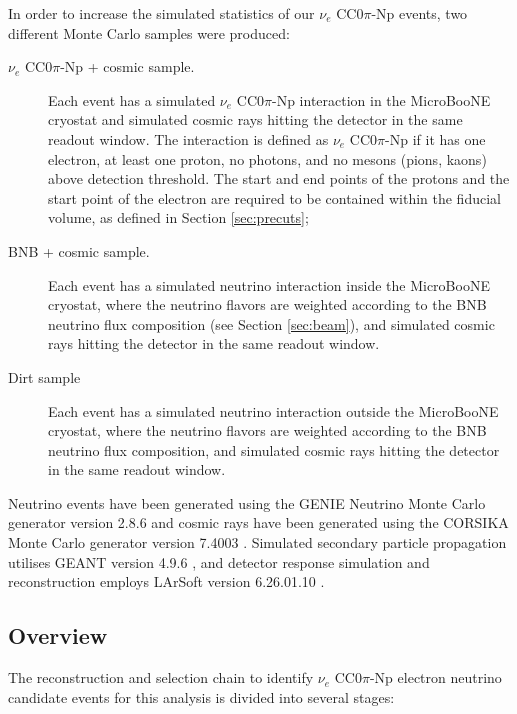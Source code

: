 In order to increase the simulated statistics of our $\nu_e$ CC0$\pi$-Np events, two different Monte Carlo samples were produced:
\begin{description}
\item[$\nu_{e}$ CC0$\pi$-Np + cosmic sample.] Each event has a simulated $\nu_{e}$ CC0$\pi$-Np interaction in the MicroBooNE cryostat and simulated cosmic rays hitting the detector in the same readout window. {The interaction is defined as $\nu_{e}$ CC0$\pi$-Np if it has one electron, at least one proton, no photons, and no mesons (pions, kaons) above detection threshold. The start and end points of the protons and the start point of the electron are required to be contained within the fiducial volume, as defined in Section \ref{sec:precuts}};
\item[BNB + cosmic sample.] Each event has a simulated neutrino interaction inside the MicroBooNE cryostat, where the neutrino flavors are weighted according to the BNB neutrino flux composition (see Section \ref{sec:beam}), and simulated cosmic rays hitting the detector in the same readout window.
\item[Dirt sample] {Each event has a simulated neutrino interaction outside the MicroBooNE cryostat, where the neutrino flavors are weighted according to the BNB neutrino flux composition, and simulated cosmic rays hitting the detector in the same readout window.}
\end{description}

Neutrino events have been generated using the GENIE Neutrino Monte Carlo generator version 2.8.6 \cite{Andreopoulos:2009rq} and cosmic rays have been generated using the CORSIKA Monte Carlo generator version 7.4003 \cite{Heck:1998vt}. Simulated secondary particle propagation utilises GEANT version 4.9.6 \cite{Brun:1994aa}, and detector response simulation and reconstruction employs LArSoft version 6.26.01.10 \cite{Church:2013hea}.

\subsection{Overview}
The reconstruction and selection chain to identify $\nu_{e}$ CC0$\pi$-Np electron neutrino candidate events for this analysis is divided into several stages:

